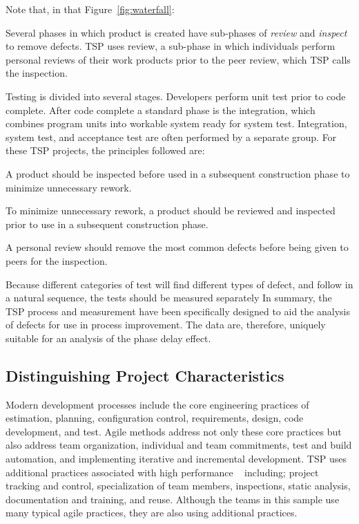 Note that, in that Figure~\ref{fig:waterfall}:
\bi 
\item
Several  phases in which product is created have sub-phases of {\em review} and {\em inspect} to remove defects. TSP uses review, a sub-phase in which individuals perform personal reviews of their work products prior to the peer review, which TSP calls the inspection.
\item Testing is divided into several stages. Developers perform unit test prior to code complete.  After code complete a standard phase is the integration, which combines program units into workable system ready for system test. Integration,  system test, and acceptance test are often performed by a separate group. 
\ei
For these TSP projects, the principles followed are: 
\bi 
\item A product should be inspected before used in a subsequent construction phase to minimize  unnecessary rework.
\item To minimize unnecessary rework, a product should be reviewed and inspected prior to use in a subsequent construction phase.
\item A personal review should remove the most common defects before being given to peers for the inspection.
\item Because different categories of test will find different types of defect, and follow in a natural sequence, the tests should be measured separately
\ei 
In summary, the TSP process and measurement have been specifically designed to aid the analysis of defects for use in process improvement. The data are, therefore, uniquely suitable for an analysis of the phase delay effect. 
\subsection{Distinguishing Project Characteristics}
Modern development processes include the core engineering practices of estimation, planning, configuration control, requirements, design, code development, and test. Agile methods address  not only these core practices but also address team organization, individual and team commitments, test and build automation, and implementing iterative and incremental development. TSP uses additional practices associated with high performance ~\cite{jones10} including; project tracking and control, specialization of team members, inspections, static analysis, documentation and training, and reuse. Although the teams in this sample use many typical agile practices, they are also using additional practices. 
